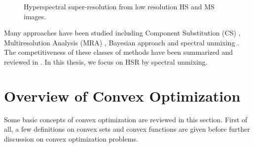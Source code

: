 \begin{figure}[t]
{
    }
    \caption{Hyperspectral super-resolution from low resolution HS and MS images.}
    \label{fig:fusion_flow}
\end{figure}
Many approaches have been studied including Component Substitution (CS)
\cite{HSMSEXISTAPPROACH_CS_IHS,
      HSMSEXISTAPPROACH_CS_ENHANCING_MS_BY_PAN,
      HSMSEXISTAPPROACH_CS_IMPROVE_CS},
Multiresolution Analysis (MRA)
\cite{HSMSEXISTAPPROACH_MRA_SMOOTH_FILTER_IMG_FUSION,
      HSMSEXISTAPPROACH_MRA_MTF},
Bayesian approach
\cite{HSMSEXISTAPPROACH_BAYESIAN_STOC_MIX_MODEL_HSR,
      HSMSEXISTAPPROACH_BAYESIAN_MAP_ESTIMATE_HSR,
      HSMSEXISTAPPROACH_BAYESIAN_HSR_BY_MS}
and spectral unmixing
\cite{CNMF,
      HSMSEXISTAPPROACH_MF_NMFPAN,
      HSR_MF,
      HSMSEXISTAPPROACH_MF_SPAT_SPEC_IMG_FUSION,
      HSMSEXISTAPPROACH_MF_HSR_LOCAL_LOWRANK,
      HSMSEXISTAPPROACH_MF_JOINT_HSR_UNMIX_INTERACT_FEEDBACK}.
The competitiveness of these classes of methods have been summarized and
reviewed in
\cite{HS_PANSHARPENING_A_REVIEW,HSMS_DATA_FUSION_A_COMPARATIVE_REVIEW}.
In this thesis, we focus on HSR by spectral unmixing.

\section{Overview of Convex Optimization}
Some basic concepts of convex optimization are reviewed in this section.
First of all, a few definitions on convex sets and convex functions are
given before further discussion on convex optimization problems.

